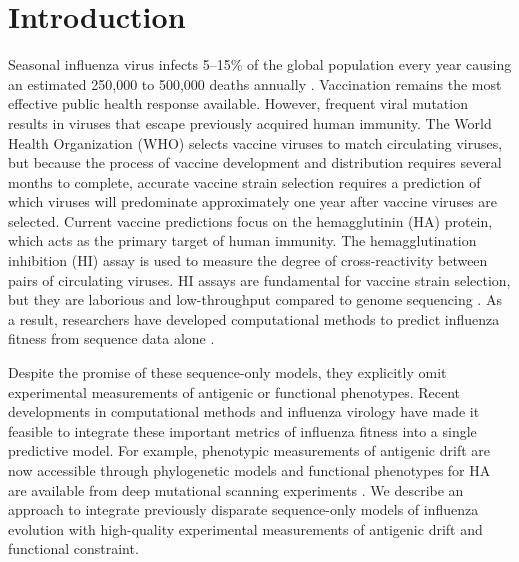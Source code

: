 
\section*{Introduction}

Seasonal influenza virus infects 5--15\% of the global population every year causing an estimated 250,000 to 500,000 deaths annually \cite{flufactsheet}.
Vaccination remains the most effective public health response available.
However, frequent viral mutation results in viruses that escape previously acquired human immunity.
The World Health Organization (WHO) selects vaccine viruses to match circulating viruses, but because the process of vaccine development and distribution requires several months to complete, accurate vaccine strain selection requires a prediction of which viruses will predominate approximately one year after vaccine viruses are selected.
Current vaccine predictions focus on the hemagglutinin (HA) protein, which acts as the primary target of human immunity.
The hemagglutination inhibition (HI) assay \cite{hirst1943studies} is used to measure the degree of cross-reactivity between pairs of circulating viruses.
HI assays are fundamental for vaccine strain selection, but they are laborious and low-throughput compared to genome sequencing \cite{Wood:2012ii}.
As a result, researchers have developed computational methods to predict influenza fitness from sequence data alone \cite{Luksza:2014hj,Steinbruck:2014kq,Neher:2014eu}.

Despite the promise of these sequence-only models, they explicitly omit experimental measurements of antigenic or functional phenotypes.
Recent developments in computational methods and influenza virology have made it feasible to integrate these important metrics of influenza fitness into a single predictive model.
For example, phenotypic measurements of antigenic drift are now accessible through phylogenetic models \cite{Neher:2016hy} and functional phenotypes for HA are available from deep mutational scanning experiments \cite{Lee2018}.
We describe an approach to integrate previously disparate sequence-only models of influenza evolution with high-quality experimental measurements of antigenic drift and functional constraint.

